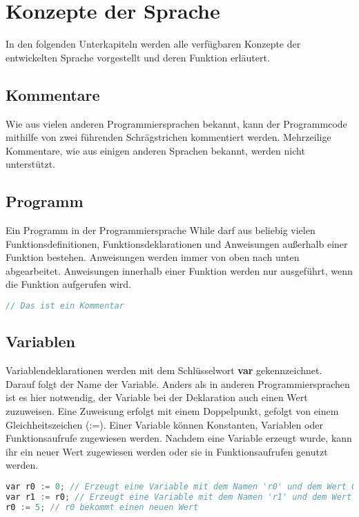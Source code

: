 \section{Konzepte der Sprache} \label{sec:while-konzepte}
In den folgenden Unterkapiteln werden alle verfügbaren Konzepte der entwickelten Sprache vorgestellt und deren Funktion erläutert.

\subsection{Kommentare}
Wie aus vielen anderen Programmiersprachen bekannt, kann der Programmcode mithilfe von zwei führenden Schrägstrichen kommentiert werden. Mehrzeilige Kommentare, wie aus einigen anderen Sprachen bekannt, werden nicht unterstützt.

\subsection{Programm}
Ein Programm in der Programmiersprache While darf aus beliebig vielen Funktionsdefinitionen, Funktionsdeklarationen und Anweisungen außerhalb einer Funktion bestehen. Anweisungen werden immer von oben nach unten abgearbeitet. Anweisungen innerhalb einer Funktion werden nur ausgeführt, wenn die Funktion aufgerufen wird.

\begin{lstlisting}[language=c, caption=Kommentare in While, label={lst:while-comment}]
	// Das ist ein Kommentar
\end{lstlisting}

\subsection{Variablen}
Variablendeklarationen werden mit dem Schlüsselwort \textbf{var} gekennzeichnet. Darauf folgt der Name der Variable. Anders als in anderen Programmiersprachen ist es hier notwendig, der Variable bei der Deklaration auch einen Wert zuzuweisen. Eine Zuweisung erfolgt mit einem Doppelpunkt, gefolgt von einem Gleichheitszeichen (:=). Einer Variable können Konstanten, Variablen oder Funktionsaufrufe zugewiesen werden. Nachdem eine Variable erzeugt wurde, kann ihr ein neuer Wert zugewiesen werden oder sie in Funktionsaufrufen genutzt werden.

\begin{lstlisting}[language=c, caption=Variablennutzung in While, label={lst:while-var-defdec}]
var r0 := 0; // Erzeugt eine Variable mit dem Namen 'r0' und dem Wert 0
var r1 := r0; // Erzeugt eine Variable mit dem Namen 'r1' und dem Wert von r0
r0 := 5; // r0 bekommt einen neuen Wert
\end{lstlisting}

